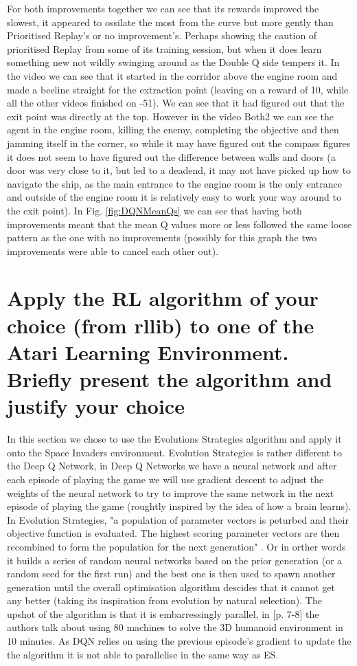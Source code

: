 \documentclass[a4pape, 11pt, english]{article}
\begin{document}
For both improvements together we can see that its rewards improved the slowest, it appeared to ossilate the most from the curve but more gently than Prioritised Replay's or no improvement's. Perhaps showing the caution of prioritised Replay from some of its training session, but when it does learn something new not wildly swinging around as the Double Q side tempers it. In the video we can see that it started in the corridor above the engine room and made a beeline straight for the extraction point (leaving on a reward of 10, while all the other videos finished on -51). We can see that it had figured out that the exit point was directly at the top. However in the video Both2 we can see the agent in the engine room, killing the enemy, completing the objective and then jamming itself in the corner, so while it may have figured out the compass figures it does not seem to have figured out the difference between walls and doors (a door was very close to it, but led to a deadend, it may not have picked up how to navigate the ship, as the main entrance to the engine room is the only entrance and outside of the engine room it is relatively easy to work your way around to the exit point). In Fig. \ref{fig:DQNMeanQs} we can see that having both improvements meant that the mean Q values more or less followed the same loose pattern as the one with no improvements (possibly for this graph the two improvements were able to cancel each other out).

\section{Apply the RL algorithm of your choice (from rllib) to one of the Atari Learning Environment. Briefly present the algorithm and justify your choice}
In this section we chose to use the Evolutions Strategies algorithm and apply it onto the Space Invaders environment. Evolution Strategies is rather different to the Deep Q Network, in Deep Q Networks we have a neural network and after each episode of playing the game we will use gradient descent to adjust the weights of the neural network to try to improve the same network in the next episode of playing the game (roughtly inspired by the idea of how a brain learns). In Evolution Strategies, "a population of parameter vectors is peturbed and their objective function is evaluated. The highest scoring parameter vectors are then recombined to form the population for the next generation" \citep{salimans_evolution_2017}. Or in orther words it builds a series of random neural networks based on the prior generation (or a random seed for the first run) and the best one is then used to spawn another generation until the overall optimisation algorithm descides that it cannot get any better (taking its inspiration from evolution by natural selection).
The upshot of the algorithm is that it is embarressingly parallel, in  \citep{salimans_evolution_2017}[p. 7-8] the authors talk about using 80 machines to solve the 3D humanoid environment in 10 minutes. As DQN relies on using the previous episode's gradient to update the the algorithm it is not able to parallelise in the same way as ES.
\end{document}

